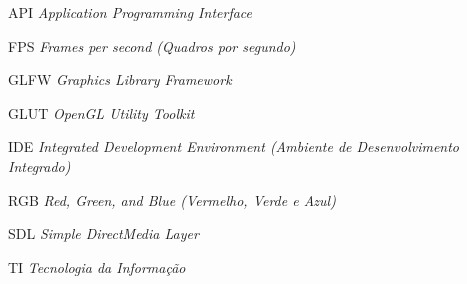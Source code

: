 \documentclass[12pt, %
openright,
oneside, %
a4paper,    %
brazil]{facom-ufu-abntex2}
\begin{document}
\listoffigures*
\cleardoublepage

\iffalse
\pdfbookmark[0]{\listtablename}{lot}
\listoftables*
\cleardoublepage
\fi


\begin{siglas} %
  \item[API] \textit{Application Programming Interface}
  \item[FPS] \textit{Frames per second (Quadros por segundo)}
  \item[GLFW] \textit{Graphics Library Framework}
  \item[GLUT] \textit{OpenGL Utility Toolkit}
  \item[IDE] \textit{Integrated Development Environment (Ambiente de Desenvolvimento Integrado)}
  \item[RGB] \textit{Red, Green, and Blue (Vermelho, Verde e Azul)}
  \item[SDL] \textit{Simple DirectMedia Layer}
  \item[TI] \textit{Tecnologia da Informação}
\end{siglas}


\tableofcontents*
\cleardoublepage





\textual


\end{document}
